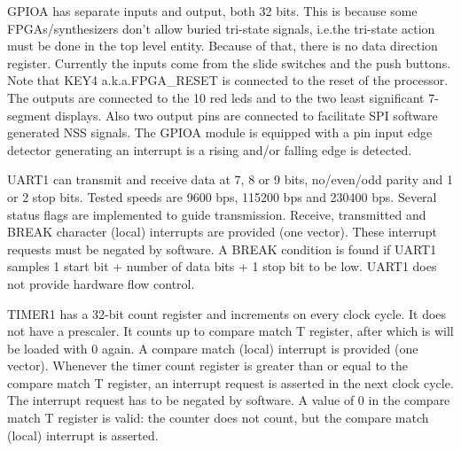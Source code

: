 \documentclass[12pt]{article}
\begin{document}
GPIOA has separate inputs and output, both 32 bits. This is because some FPGAs/synthesizers don't allow buried tri-state signals, i.e.\@ the tri-state action must be done in the top level entity. Because of that, there is no data direction register. Currently the inputs come from the slide switches and the push buttons. Note that KEY4 a.k.a.\@ FPGA\_RESET is connected to the reset of the processor. The outputs are connected to the 10 red leds and to the two least significant 7-segment displays. Also two output pins are connected to facilitate SPI software generated NSS signals. The GPIOA module is equipped with a pin input edge detector generating an interrupt is a rising and/or falling edge is detected.

UART1 can transmit and receive data at 7, 8 or 9 bits, no/even/odd parity and 1 or 2 stop bits. Tested speeds are 9600 bps, 115200 bps and 230400 bps. Several status flags are implemented to guide transmission. Receive, transmitted and BREAK character (local) interrupts are provided (one vector). These interrupt requests must be negated by software. A BREAK condition is found if UART1 samples 1 start bit + number of data bits + 1 stop bit to be low. UART1 does not provide hardware flow control.

TIMER1 has a 32-bit count register and increments on every clock cycle. It does not have a prescaler. It counts up to compare match T register, after which is will be loaded with 0 again. A compare match (local) interrupt is provided (one vector). Whenever the timer count register is greater than or equal to the compare match T register, an interrupt request is asserted in the next clock cycle. The interrupt request has to be negated by software. A value of 0 in the compare match T register is valid: the counter does not count, but the compare match (local) interrupt is asserted.
\end{document}
